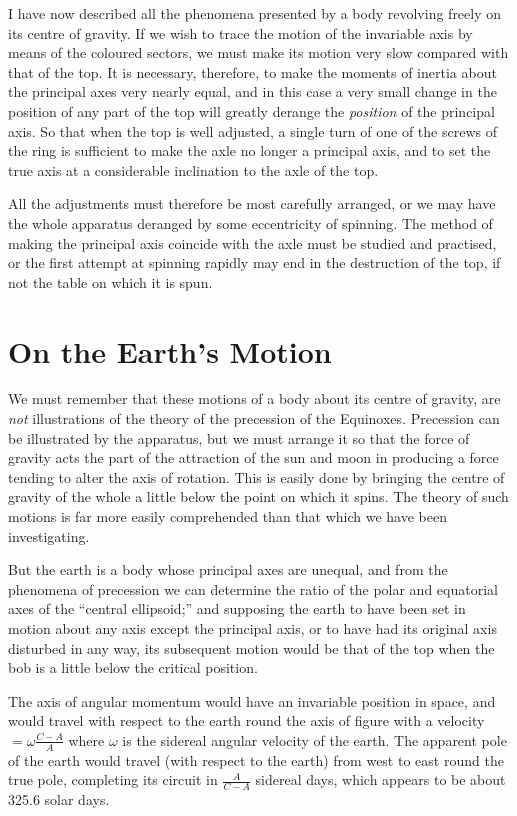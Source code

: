 \documentclass[12pt]{article}
\begin{document}
I have now described all the phenomena presented by a body revolving
freely on its centre of gravity.  If we wish to trace the motion of
the invariable axis by means of the coloured sectors, we must make its
motion very slow compared with that of the top.  It is necessary,
therefore, to make the moments of inertia about the principal axes
very nearly equal, and in this case a very small change in the
position of any part of the top will greatly derange the
\emph{position} of the principal axis.  So that when the top is well
adjusted, a single turn of one of the screws of the ring is sufficient
to make the axle no longer a principal axis, and to set the true axis
at a considerable inclination to the axle of the top.

All the adjustments must therefore be most carefully arranged, or we
may have the whole apparatus deranged by some eccentricity of
spinning.  The method of making the principal axis coincide with the
axle must be studied and practised, or the first attempt at spinning
rapidly may end in the destruction of the top, if not the table on
which it is spun.

\section*{On the Earth's Motion}

We must remember that these motions of a body about its centre of
gravity, are \emph{not} illustrations of the theory of the precession
of the Equinoxes.  Precession can be illustrated by the apparatus, but
we must arrange it so that the force of gravity acts the part of the
attraction of the sun and moon in producing a force tending to alter
the axis of rotation.  This is easily done by bringing the centre of
gravity of the whole a little below the point on which it spins.  The
theory of such motions is far more easily comprehended than that which
we have been investigating.

But the earth is a body whose principal axes are unequal, and from the
phenomena of precession we can determine the ratio of the polar and
equatorial axes of the ``central ellipsoid;'' and supposing the earth to
have been set in motion about any axis except the principal axis, or
to have had its original axis disturbed in any way, its subsequent
motion would be that of the top when the bob is a little below the
critical position.

The axis of angular momentum would have an invariable position in
space, and would travel with respect to the earth round the axis of
figure with a velocity $\displaystyle = \omega\frac{C - A}{A}$ where
$\omega$ is the sidereal angular velocity of the earth.  The apparent
pole of the earth would travel (with respect to the earth) from west
to east round the true pole, completing its circuit in $\displaystyle
\frac{A}{C - A}$ sidereal days, which appears to be about 325.6 solar
days.
\end{document}
